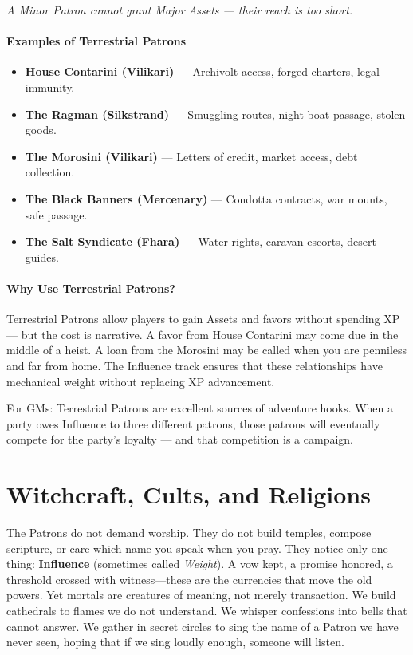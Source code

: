 \begin{tcolorbox}[colback=black!3!white, colframe=black!40!white, title=Terrestrial Patrons --- Mortal Powers That Collect,breakable]
  \noindent \textit{A Minor Patron cannot grant Major Assets --- their reach is too short.}
  
  \paragraph{Examples of Terrestrial Patrons}
  \begin{itemize}
      \item \textbf{House Contarini (Vilikari)} --- Archivolt access, forged charters, legal immunity.
      \item \textbf{The Ragman (Silkstrand)} --- Smuggling routes, night-boat passage, stolen goods.
      \item \textbf{The Morosini (Vilikari)} --- Letters of credit, market access, debt collection.
      \item \textbf{The Black Banners (Mercenary)} --- Condotta contracts, war mounts, safe passage.
      \item \textbf{The Salt Syndicate (Fhara)} --- Water rights, caravan escorts, desert guides.
  \end{itemize}
  
  \paragraph{Why Use Terrestrial Patrons?}
  Terrestrial Patrons allow players to gain Assets and favors without spending XP --- but the cost is narrative. A favor from House Contarini may come due in the middle of a heist. A loan from the Morosini may be called when you are penniless and far from home. The Influence track ensures that these relationships have mechanical weight without replacing XP advancement.
  
  For GMs: Terrestrial Patrons are excellent sources of adventure hooks. When a party owes Influence to three different patrons, those patrons will eventually compete for the party's loyalty --- and that competition is a campaign.
  
  \end{tcolorbox}
  
\section{Witchcraft, Cults, and Religions}
\label{sec:witchcraft-cults-religions}

The Patrons do not demand worship. They do not build temples, compose scripture, or care which name you speak when you pray. They notice only one thing: \textbf{Influence} (sometimes called \textit{Weight}). A vow kept, a promise honored, a threshold crossed with witness---these are the currencies that move the old powers. Yet mortals are creatures of meaning, not merely transaction. We build cathedrals to flames we do not understand. We whisper confessions into bells that cannot answer. We gather in secret circles to sing the name of a Patron we have never seen, hoping that if we sing loudly enough, someone will listen.

